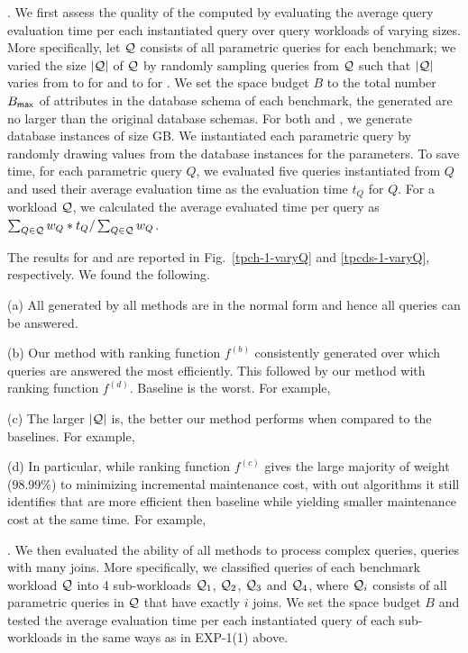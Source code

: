 {. We first assess the quality of the
computed \bdss by evaluating the average query evaluation time
per each instantiated query over query workloads of varying sizes.
More specifically, let $\mathcal Q$ consists of all parametric queries
for each benchmark; we varied the size $|\mathcal Q|$ of $\mathcal Q$ by randomly
sampling queries from $\mathcal Q$ such that $|\mathcal Q|$ varies from \xx to
\xx for \tpch and \xx to \xx for \tpcds. We set the space budget
$B$ to the total number $B_{\protect\mathsf{max}}$ of attributes in the database schema of
each benchmark, \ie the generated \bdss are no larger than the
original database schemas. For both \tpch and \tpcds, we generate
database instances of size \xx GB. We instantiated each
parametric query by randomly drawing values from the database
instances for the parameters. To save time, for each parametric
query $Q$, we evaluated five queries instantiated from $Q$ and
used their average evaluation time as the evaluation time $t_{Q}$
for $Q$. For a workload $\mathcal Q$, we calculated the average evaluated
time per query as $\sum_{Q\in \mathcal Q} w_{Q}*t_{Q}/\sum_{Q\in \mathcal Q}w_{Q}$.

The results for \tpch and \tpcds are reported in
Fig.~\ref{tpch-1-varyQ} and \ref{tpcds-1-varyQ}, respectively.
We found the following. 

\sstab (a) All \bdss generated by all methods are in the normal
form and hence all queries can be answered. 

\sstab (b) Our method with ranking function $f^{(b)}$
consistently generated \bdss over which queries are answered the
most efficiently. This followed by our method with ranking
function $f^{(d)}$. Baseline \qcssel is the worst.
For example, 


\sstab (c) The larger $|\mathcal Q|$ is, the better our method performs
when compared to the baselines. For example, 


\sstab (d) In particular, while ranking function $f^{(c)}$ gives
the large majority of weight (98.99\%) to minimizing incremental
maintenance cost, with out algorithms it still identifies \bdss
that are more efficient then baseline \qcssel while yielding
smaller maintenance cost at the same time. 
For example, 


.
We then evaluated the ability of all methods to process complex
queries, \ie queries with many joins. More specifically, we
classified queries of each benchmark workload $\mathcal Q$ into 4 sub-workloads
$\mathcal Q_{1}$, $\mathcal Q_{2}$, $\mathcal Q_{3}$ and $\mathcal Q_{4}$, where $\mathcal Q_{i}$
consists of all parametric queries in $\mathcal Q$ that have exactly $i$
joins. We set the space budget $B$ and tested the average
evaluation time per each instantiated query of each sub-workloads
in the same ways as in EXP-1(1) above.

}
